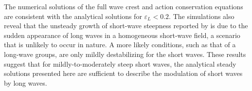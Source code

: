 \documentclass[lineno]{jfm}
\begin{document}
The numerical solutions of the full wave crest and action conservation equations
are consistent with the analytical solutions for $\varepsilon_L < 0.2$.
The simulations also reveal that the unsteady growth of short-wave steepness
reported by \citet{peureux2021unsteady} is due to the sudden appearance of
long waves in a homogeneous short-wave field, a scenario that is unlikely to
occur in nature.
A more likely conditions, such as that of a long-wave groups, are only mildly
destabilizing for the short waves.
These results suggest that for mildly-to-moderately steep short waves,
the analytical steady solutions presented here are sufficient to describe the
modulation of short waves by long waves.









\end{document}
